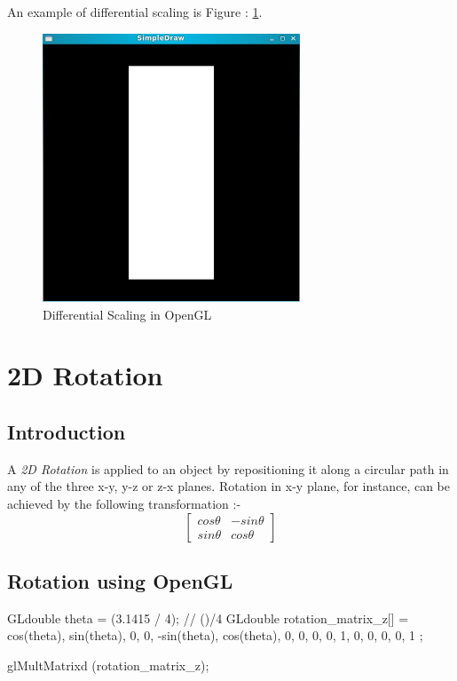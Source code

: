 \documentclass[a4paper,12pt,titlepage,twosided]{article}
\begin{document}
	An example of differential scaling is Figure : \ref{fig:differential_scaling}.
	\begin{figure}
		\includegraphics[height=80mm]{Images_final/Square_non_uniform_scaling.jpg}
		\caption{Differential Scaling in OpenGL}
		\label{fig:differential_scaling}
	\end{figure}

\pagebreak
\section{2D Rotation}
	\subsection{Introduction}
	A \emph{2D Rotation} is applied to an object by repositioning it along a circular path in any of the three x-y, y-z or z-x planes. Rotation in x-y plane, for instance, can be achieved by the following transformation :-
	\begin{equation}
		\begin{bmatrix}
			cos \theta & -sin \theta \\
			sin \theta &  cos \theta 
		\end{bmatrix}
	\end{equation}

	\subsection {Rotation using OpenGL}

	\begin{code}
		GLdouble theta = (3.1415 / 4);		// (\pi)/4
		GLdouble rotation_matrix_z[] = { cos(theta), sin(theta), 0, 0, 
						-sin(theta), cos(theta), 0, 0, 
						0, 0, 1, 0,
						0, 0, 0, 1 };

		glMultMatrixd (rotation_matrix_z);
	\end{code}
\end{document}
